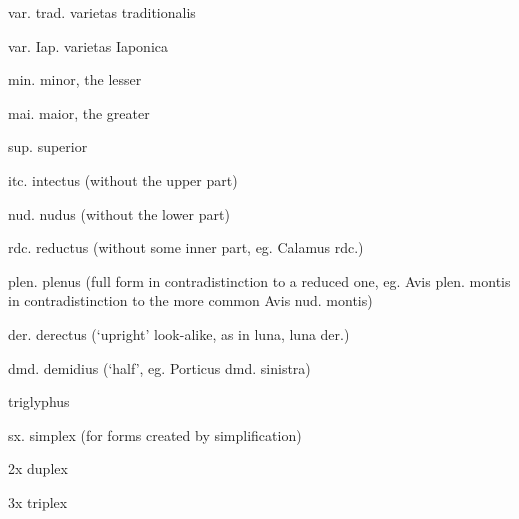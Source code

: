 var. {\mktsStyleItalic{}trad.\/} varietas traditionalis


var. {\mktsStyleItalic{}Iap.\/} varietas Iaponica


min. minor, the lesser


mai. maior, the greater


sup. superior


itc. intectus (without the upper part)


nud. nudus (without the lower part)


rdc. reductus (without some inner part, eg. {} Calamus rdc.)


plen. plenus (full form in contradistinction to a reduced one, eg.  {} Avis plen. montis in contradistinction to the more common {} Avis nud. montis)


der. derectus (‘upright’ look-alike, as in {} luna, {} luna der.)


dmd. demidius (‘half’, eg. {} {\mktsStyleItalic{}Porticus dmd. sinistra\/})


triglyphus


sx. simplex (for forms created by simplification)


2x duplex


3x triplex


